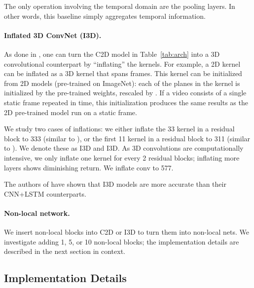 \documentclass[10pt,twocolumn,letterpaper]{article}
\def\x{}
\begin{document}
The only operation involving the temporal domain are the pooling layers. In other words, this baseline simply aggregates temporal information.

\paragraph{Inflated 3D ConvNet (I3D).} As done in \cite{Feichtenhofer2016,Carreira2017}, one can turn the C2D model in Table~\ref{tab:arch} into a 3D convolutional counterpart by ``inflating'' the kernels. For example, a 2D \x kernel can be inflated as a 3D \x\x kernel that spans  frames. This kernel can be initialized from 2D models (pre-trained on ImageNet): each of the  planes in the \x\x kernel is initialized by the pre-trained \x weights, rescaled by . If a video consists of a single static frame repeated in time, this initialization produces the same results as the 2D pre-trained model run on a static frame.

We study two cases of inflations: we either inflate the 3\x3 kernel in a residual block to 3\x3\x3 (similar to \cite{Carreira2017}), or the first 1\x1 kernel in a residual block to 3\x1\x1 (similar to \cite{Feichtenhofer2016}). We denote these as I3D and I3D. As 3D convolutions are computationally intensive, we only inflate one kernel for every 2 residual blocks; inflating more layers shows diminishing return.
We inflate conv to 5\x7\x7.

The authors of \cite{Carreira2017} have shown that I3D models are more accurate than their CNN+LSTM counterparts.

\paragraph{Non-local network.} We insert non-local blocks into C2D or I3D to turn them into non-local nets. We investigate adding 1, 5, or 10 non-local blocks; the implementation details are described in the next section in context.

\subsection{Implementation Details}
\end{document}
